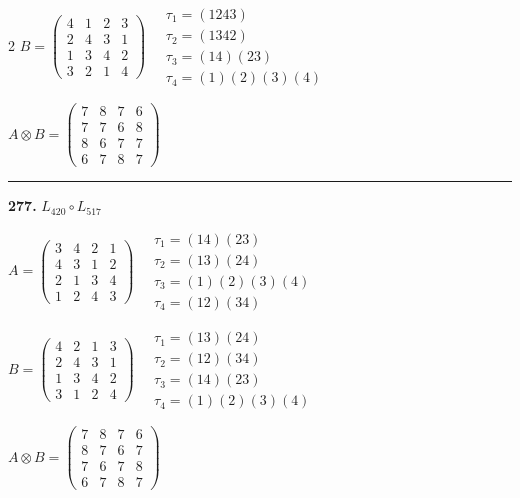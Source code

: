 \begin{multicols}{2}
$B = \begin{pmatrix} 4 & 1 & 2 & 3 \\ 2 & 4 & 3 & 1 \\ 1 & 3 & 4 & 2 \\ 3 & 2 & 1 & 4 \end{pmatrix} \quad \begin{matrix} \tau_{1}=(1 2 4 3) \\ \tau_{2}=(1 3 4 2) \\ \tau_{3}=(1 4)(2 3) \\ \tau_{4}=(1)(2)(3)(4) \end{matrix}$

$A \otimes B = \begin{pmatrix} 7 & 8 & 7 & 6 \\ 7 & 7 & 6 & 8 \\ 8 & 6 & 7 & 7 \\ 6 & 7 & 8 & 7 \end{pmatrix}$

\vspace{0.3em}
\hrule
\vspace{0.3em}

\noindent\textbf{277.} $L_{420} \circ L_{517}$

$A = \begin{pmatrix} 3 & 4 & 2 & 1 \\ 4 & 3 & 1 & 2 \\ 2 & 1 & 3 & 4 \\ 1 & 2 & 4 & 3 \end{pmatrix} \quad \begin{matrix} \tau_{1}=(1 4)(2 3) \\ \tau_{2}=(1 3)(2 4) \\ \tau_{3}=(1)(2)(3)(4) \\ \tau_{4}=(1 2)(3 4) \end{matrix}$

$B = \begin{pmatrix} 4 & 2 & 1 & 3 \\ 2 & 4 & 3 & 1 \\ 1 & 3 & 4 & 2 \\ 3 & 1 & 2 & 4 \end{pmatrix} \quad \begin{matrix} \tau_{1}=(1 3)(2 4) \\ \tau_{2}=(1 2)(3 4) \\ \tau_{3}=(1 4)(2 3) \\ \tau_{4}=(1)(2)(3)(4) \end{matrix}$

$A \otimes B = \begin{pmatrix} 7 & 8 & 7 & 6 \\ 8 & 7 & 6 & 7 \\ 7 & 6 & 7 & 8 \\ 6 & 7 & 8 & 7 \end{pmatrix}$


\end{multicols}
